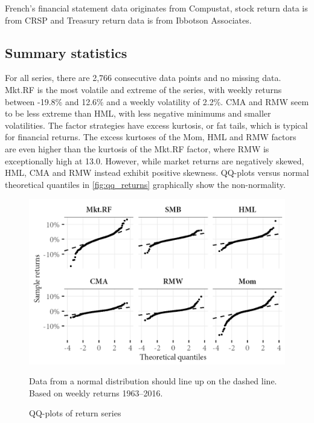French's financial statement data originates from Compustat, stock return data is from CRSP and Treasury return data is from Ibbotson Associates.

\subsection{Summary statistics}



For all series, there are 2,766 consecutive data points and no missing data. Mkt.RF is the most volatile and extreme of the series, with weekly returns between -19.8\% and 12.6\% and a weekly volatility of 2.2\%. CMA and RMW seem to be less extreme than HML, with less negative minimums and smaller volatilities. The factor strategies have excess kurtosis, or fat tails, which is typical for financial returns. The excess kurtoses of the Mom, HML and RMW factors are even higher than the kurtosis of the Mkt.RF factor, where RMW is exceptionally high at 13.0. However, while market returns are negatively skewed, HML, CMA and RMW instead exhibit positive skewness. QQ-plots versus normal theoretical quantiles in \autoref{fig:qq_returns} graphically show the non-normality.

\begin{figure}[ht!]
  \centering
  \footnotesize
  \includegraphics[scale=1]{graphics/qq_returns.png}
  \caption{QQ-plots of return series}
  \begin{longcaption}
    Data from a normal distribution should line up on the dashed line. Based on weekly returns 1963--2016.
  \end{longcaption}
  \label{fig:qq_returns}
\end{figure}

